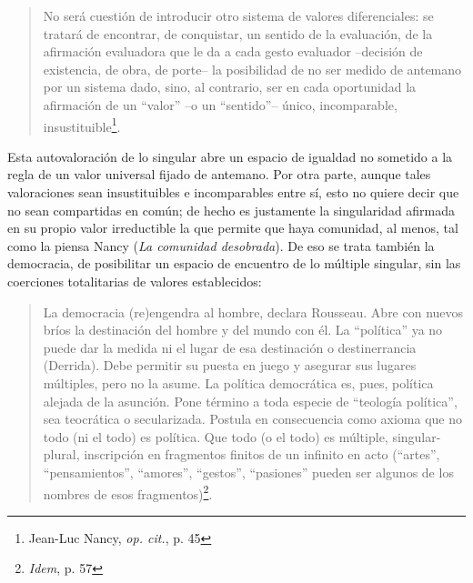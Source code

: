 \documentclass{book}
\begin{document}
\begin{quote}
No será cuestión de introducir otro sistema de valores diferenciales: se
tratará de encontrar, de conquistar, un sentido de la evaluación, de la
afirmación evaluadora que le da a cada gesto evaluador --decisión de
existencia, de obra, de porte-- la posibilidad de no ser medido de
antemano por un sistema dado, sino, al contrario, ser en cada
oportunidad la afirmación de un ``valor'' --o un ``sentido''-- único,
incomparable, insustituible\footnote{Jean-Luc Nancy, \emph{op. cit.}, p.
  45}.
\end{quote}

Esta autovaloración de lo singular abre un espacio de igualdad no
sometido a la regla de un valor universal fijado de antemano. Por otra
parte, aunque tales valoraciones sean insustituibles e incomparables
entre sí, esto no quiere decir que no sean compartidas en común; de
hecho es justamente la singularidad afirmada en su propio valor
irreductible la que permite que haya comunidad, al menos, tal como la
piensa Nancy (\emph{La comunidad desobrada}). De eso se trata también la
democracia, de posibilitar un espacio de encuentro de lo múltiple
singular, sin las coerciones totalitarias de valores establecidos:

\begin{quote}
La democracia (re)engendra al hombre, declara Rousseau. Abre con nuevos
bríos la destinación del hombre y del mundo con él. La ``política'' ya
no puede dar la medida ni el lugar de esa destinación o destinerrancia
(Derrida). Debe permitir su puesta en juego y asegurar sus lugares
múltiples, pero no la asume. La política democrática es, pues, política
alejada de la asunción. Pone término a toda especie de ``teología
política'', sea teocrática o secularizada. Postula en consecuencia como
axioma que no todo (ni el todo) es política. Que todo (o el todo) es
múltiple, singular-plural, inscripción en fragmentos finitos de un
infinito en acto (``artes'', ``pensamientos'', ``amores'', ``gestos'',
``pasiones'' pueden ser algunos de los nombres de esos
fragmentos)\footnote{\emph{Idem}, p. 57}.
\end{quote}
\end{document}
